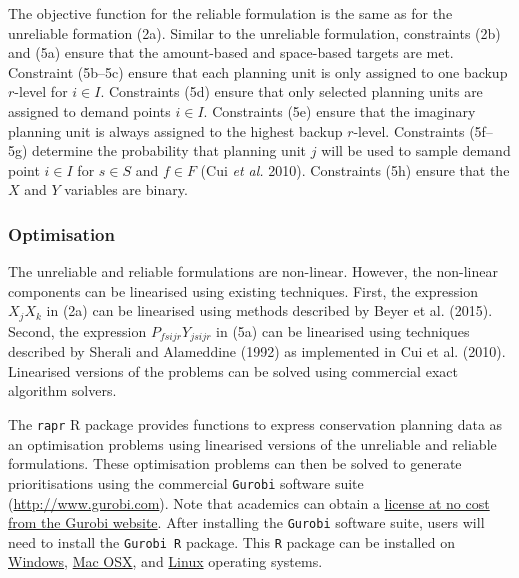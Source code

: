 \documentclass[11pt,]{article}
\begin{document}
The objective function for the reliable formulation is the same as for
the unreliable formation (2a). Similar to the unreliable formulation,
constraints (2b) and (5a) ensure that the amount-based and space-based
targets are met. Constraint (5b--5c) ensure that each planning unit is
only assigned to one backup $r$-level for $i \in I$. Constraints (5d)
ensure that only selected planning units are assigned to demand points
$i \in I$. Constraints (5e) ensure that the imaginary planning unit is
always assigned to the highest backup $r$-level. Constraints (5f--5g)
determine the probability that planning unit $j$ will be used to sample
demand point $i \in I$ for $s \in S$ and $f \in F$ (Cui \emph{et al.}
2010). Constraints (5h) ensure that the $X$ and $Y$ variables are
binary.

\subsubsection{Optimisation}\label{optimisation}

The unreliable and reliable formulations are non-linear. However, the
non-linear components can be linearised using existing techniques.
First, the expression $X_j X_k$ in (2a) can be linearised using methods
described by Beyer et al. (2015). Second, the expression
$P_{fsijr} Y_{jsijr}$ in (5a) can be linearised using techniques
described by Sherali and Alameddine (1992) as implemented in Cui et al.
(2010). Linearised versions of the problems can be solved using
commercial exact algorithm solvers.

The \texttt{rapr} R package provides functions to express conservation
planning data as an optimisation problems using linearised versions of
the unreliable and reliable formulations. These optimisation problems
can then be solved to generate prioritisations using the commercial
\texttt{Gurobi} software suite (\url{http://www.gurobi.com}). Note that
academics can obtain a
\href{http://user.gurobi.com/download/licenses/free-academic}{license at
no cost from the Gurobi website}. After installing the \texttt{Gurobi}
software suite, users will need to install the \texttt{Gurobi R}
package. This \texttt{R} package can be installed on
\href{http://www.gurobi.com/documentation/6.5/quickstart_windows/r_installing_the_r_package.html}{Windows},
\href{http://www.gurobi.com/documentation/6.5/quickstart_mac/r_installing_the_r_package.html}{Mac
OSX}, and
\href{http://www.gurobi.com/documentation/6.5/quickstart_linux/r_installing_the_r_package.html}{Linux}
operating systems.
\end{document}
